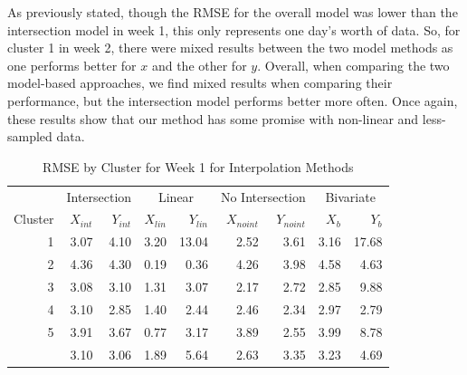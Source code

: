 \documentclass[12pt]{article}
\begin{document}
As previously stated, though the RMSE for the overall model was lower
than the intersection model in week 1, this only represents one day's
worth of data. So, for cluster 1 in week 2, there were mixed results
between the two model methods as one performs better for \(x\) and the
other for \(y\). Overall, when comparing the two model-based approaches,
we find mixed results when comparing their performance, but the
intersection model performs better more often. Once again, these results
show that our method has some promise with non-linear and less-sampled
data.

\begin{table}

\caption{\label{tab:results-clust1-actual}RMSE by Cluster for Week 1 for Interpolation Methods}
\centering
\begin{tabular}[t]{rrrrrrrrr}
\toprule
\multicolumn{1}{c}{ } & \multicolumn{2}{c}{Intersection} & \multicolumn{2}{c}{Linear} & \multicolumn{2}{c}{No Intersection} & \multicolumn{2}{c}{Bivariate} \\
\cmidrule(l{3pt}r{3pt}){2-3} \cmidrule(l{3pt}r{3pt}){4-5} \cmidrule(l{3pt}r{3pt}){6-7} \cmidrule(l{3pt}r{3pt}){8-9}
Cluster & $X_{int}$ & $Y_{int}$ & $X_{lin}$ & $Y_{lin}$ & $X_{noint}$ & $Y_{noint}$ & $X_b$ & $Y_b$\\
\midrule
1 & 3.07 & 4.10 & 3.20 & 13.04 & 2.52 & 3.61 & 3.16 & 17.68\\
2 & 4.36 & 4.30 & 0.19 & 0.36 & 4.26 & 3.98 & 4.58 & 4.63\\
3 & 3.08 & 3.10 & 1.31 & 3.07 & 2.17 & 2.72 & 2.85 & 9.88\\
4 & 3.10 & 2.85 & 1.40 & 2.44 & 2.46 & 2.34 & 2.97 & 2.79\\
5 & 3.91 & 3.67 & 0.77 & 3.17 & 3.89 & 2.55 & 3.99 & 8.78\\
\addlinespace
6 & 3.10 & 3.06 & 1.89 & 5.64 & 2.63 & 3.35 & 3.23 & 4.69\\
\bottomrule
\end{tabular}
\end{table}
\end{document}
